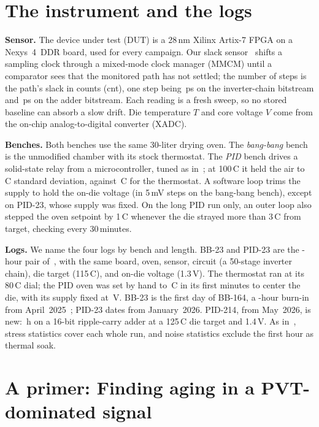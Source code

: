\documentclass[10pt,twocolumn]{article}
\newcommand{\degC}{\,\textdegree C}
\begin{document}
\section{The instrument and the logs}

\textbf{Sensor.} The device under test (DUT) is a 28\,nm Xilinx Artix-7 FPGA on a Nexys~4~DDR board, used for every campaign. Our slack sensor~\cite{sbcci25} shifts a sampling clock through a mixed-mode clock manager (MMCM) until a comparator sees that the monitored path has not settled; the number of steps is the path's slack in counts (cnt), one step being \vPsINV\,ps on the inverter-chain bitstream and \vPsRCA\,ps on the adder bitstream. Each reading is a fresh sweep, so no stored baseline can absorb a slow drift. Die temperature $T$ and core voltage $V$ come from the on-chip analog-to-digital converter (XADC).

\textbf{Benches.} Both benches use the same 30-liter drying oven. The \emph{bang-bang} bench is the unmodified chamber with its stock thermostat. The \emph{PID} bench drives a solid-state relay from a microcontroller, tuned as in~\cite{sbcci26}; at 100\degC{} it held the air to \vSdTuned\degC{} standard deviation, against \vSdThermo\degC{} for the thermostat. A software loop trims the supply to hold the on-die voltage (in 5\,mV steps on the bang-bang bench), except on PID-23, whose supply was fixed. On the long PID run only, an outer loop also stepped the oven setpoint by 1\degC{} whenever the die strayed more than 3\degC{} from target, checking every 30\,minutes.

\textbf{Logs.} We name the four logs by bench and length. BB-23 and PID-23 are the \vDurPair-hour pair of~\cite{sbcci26}, with the same board, oven, sensor, circuit (a 50-stage inverter chain), die target (115\degC), and on-die voltage (1.3\,V). The thermostat ran at its 80\degC{} dial; the PID oven was set by hand to \vPIDspMax\degC{} in its first minutes to center the die, with its supply fixed at \vVpsuPID\,V. BB-23 is the first day of BB-164, a \vDurBBlong-hour burn-in from April~2025~\cite{sbcci25}; PID-23 dates from January~2026. PID-214, from May~2026, is new: \vDurRCA\,h on a 16-bit ripple-carry adder at a 125\degC{} die target and 1.4\,V. As in~\cite{sbcci26}, stress statistics cover each whole run, and noise statistics exclude the first hour as thermal soak.

\section{A primer: Finding aging in a PVT-dominated signal}
\end{document}
